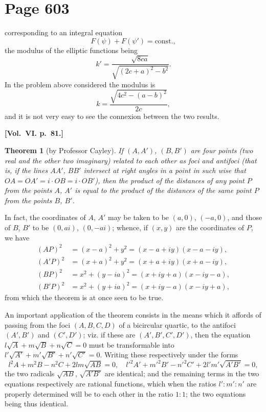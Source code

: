 \documentclass[12pt,a4paper]{article}
\theoremstyle{plain}
\newtheorem{theorem}{Theorem}
\theoremstyle{definition}
\theoremstyle{remark}
\begin{document}
\section*{Page 603}
\setcounter{page}{603}

corresponding to an integral equation
\[
F(\psi) + F(\psi') = \text{const.},
\]
the modulus of the elliptic functions being
\[
k' = \frac{\sqrt{8ca}}{\sqrt{(2c+a)^2 - b^2}}.
\]
In the problem above considered the modulus is
\[
k = \frac{\sqrt{4c^2 - (a-b)^2}}{2c},
\]
and it is not very easy to see the connexion between the two results.

\medskip\noindent\textbf{[Vol.~VI. p.~81.]}

\begin{theorem}[by Professor Cayley]
If $(A, A')$, $(B, B')$ are four points (two real and the other two imaginary) related to each other as foci and antifoci (that is, if the lines $AA'$, $BB'$ intersect at right angles in a point in such wise that $OA = OA' = i \cdot OB = i \cdot OB'$), then the product of the distances of any point $P$ from the points $A$, $A'$ is equal to the product of the distances of the same point $P$ from the points $B$, $B'$.
\end{theorem}

In fact, the coordinates of $A$, $A'$ may be taken to be $(a, 0)$, $(-a, 0)$, and those of $B$, $B'$ to be $(0, ai)$, $(0, -ai)$; whence, if $(x, y)$ are the coordinates of $P$, we have
\begin{align*}
(AP)^2 &= (x-a)^2 + y^2 = (x - a + iy)(x - a - iy),\\
(A'P)^2 &= (x+a)^2 + y^2 = (x + a + iy)(x + a - iy),\\
(BP)^2 &= x^2 + (y - ia)^2 = (x + iy + a)(x - iy - a),\\
(B'P)^2 &= x^2 + (y + ia)^2 = (x + iy - a)(x - iy + a),
\end{align*}
from which the theorem is at once seen to be true.

An important application of the theorem consists in the means which it affords of passing from the foci $(A, B, C, D)$ of a bicircular quartic, to the antifoci $(A', B')$ and $(C', D')$; viz. if these are $(A', B', C', D')$, then the equation $l\sqrt{A} + m\sqrt{B} + n\sqrt{C} = 0$ must be transformable into $l'\sqrt{A'} + m'\sqrt{B'} + n'\sqrt{C'} = 0$. Writing these respectively under the forms
\[
l^2A + m^2B - n^2C + 2lm\sqrt{AB} = 0, \quad
l'^2A' + m'^2B' - n'^2C' + 2l'm'\sqrt{A'B'} = 0,
\]
the two radicals $\sqrt{AB}$, $\sqrt{A'B'}$ are identical; and the remaining terms in the two equations respectively are rational functions, which when the ratios $l' : m' : n'$ are properly determined will be to each other in the ratio $1 : 1$; the two equations being thus identical.
\end{document}
